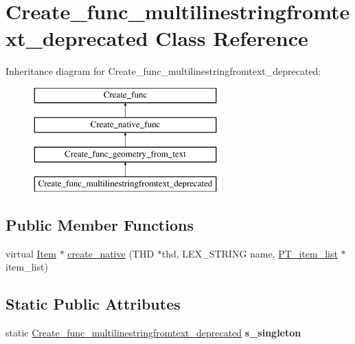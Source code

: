 \hypertarget{classCreate__func__multilinestringfromtext__deprecated}{}\section{Create\+\_\+func\+\_\+multilinestringfromtext\+\_\+deprecated Class Reference}
\label{classCreate__func__multilinestringfromtext__deprecated}
Inheritance diagram for Create\+\_\+func\+\_\+multilinestringfromtext\+\_\+deprecated\+:\begin{figure}[H]
\begin{center}
\leavevmode
\includegraphics[height=4.000000cm]{classCreate__func__multilinestringfromtext__deprecated}
\end{center}
\end{figure}
\subsection*{Public Member Functions}
\begin{DoxyCompactItemize}
\item 
virtual \mbox{\hyperlink{classItem}{Item}} $\ast$ \mbox{\hyperlink{classCreate__func__multilinestringfromtext__deprecated_a8994e5152dc5e7d389dab02346f5e1eb}{create\+\_\+native}} (T\+HD $\ast$thd, L\+E\+X\+\_\+\+S\+T\+R\+I\+NG name, \mbox{\hyperlink{classPT__item__list}{P\+T\+\_\+item\+\_\+list}} $\ast$item\+\_\+list)
\end{DoxyCompactItemize}
\subsection*{Static Public Attributes}
\begin{DoxyCompactItemize}
\item 
\mbox{\label{classCreate__func__multilinestringfromtext__deprecated_a435670ed2f90b1dd1e9485905551cdb3}} 
static \mbox{\hyperlink{classCreate__func__multilinestringfromtext__deprecated}{Create\+\_\+func\+\_\+multilinestringfromtext\+\_\+deprecated}} {\bfseries s\+\_\+singleton}
\end{DoxyCompactItemize}
